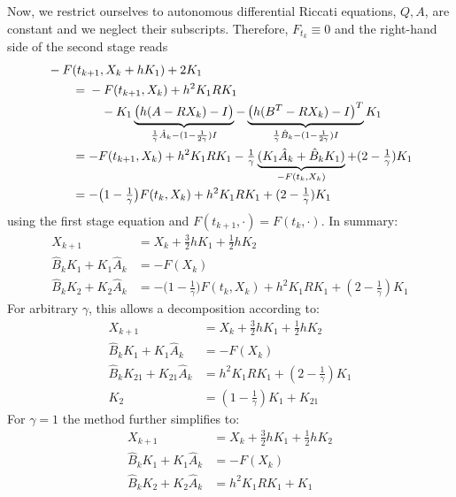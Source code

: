 Now, we restrict ourselves to autonomous differential Riccati equations,
\ie $Q, A$, \etc are constant and we neglect their subscripts.
Therefore, $F_{t_k}\equiv 0$ and the right-hand side of the second stage reads
\begin{subequations}\label{eq:mena:stage2:rhs:autonomous}
\begin{align}
  \MoveEqLeft
  -F(t_{k+1}, X_k + hK_1) + 2K_1
  \nonumber \\
  &= \begin{multlined}[t]
    -F(t_{k+1}, X_k) + h^2 K_1 R K_1 \\
    - K_1
    \underbrace{
      \big(h(A - R X_k) - I\big)
    }_{\frac{1}{\gamma} \hat{A}_k - (1-\frac{1}{2\gamma}) I}
    - \underbrace{
      \big(h(B^T - R X_k) - I\big)^T
    }_{\frac{1}{\gamma} \hat{B}_k - (1-\frac{1}{2\gamma}) I}
    K_1
  \end{multlined} \\
  &=
  -F(t_{k+1}, X_k) + h^2 K_1 R K_1
  -\tfrac{1}{\gamma}
  \underbrace{
    (K_1 \hat{A}_k + \hat{B}_k K_1)
  }_{-F(t_k,X_k)}
  + (2-\tfrac{1}{\gamma}) K_1 \\
  &= -\big(1-\tfrac{1}{\gamma}\big) F(t_k, X_k)
  + h^2 K_1 R K_1
  + (2-\tfrac{1}{\gamma}) K_1
\end{align}
\end{subequations}
using the first stage equation and $F(t_{k+1}, \cdot) = F(t_k,\cdot)$.
In summary:
\begin{subequations}
\begin{align}
  X_{k+1} &= X_k + \tfrac{3}{2} h K_1 + \tfrac{1}{2} h K_2 \\
  \hat{B}_k K_1 + K_1 \hat{A}_k &= -F(X_k) \\
  \hat{B}_k K_2 + K_2 \hat{A}_k &=
  -\big(1-\tfrac{1}{\gamma}\big) F(t_k, X_k)
  + h^2 K_1 R K_1
  + (2-\tfrac{1}{\gamma}) K_1
\end{align}
\end{subequations}
For arbitrary $\gamma$, this allows a decomposition according to:
\begin{subequations}\label{eq:mena:stages:autonomous}
\begin{align}
  X_{k+1} &= X_k + \tfrac{3}{2} h K_1 + \tfrac{1}{2} h K_2 \\
  \hat{B}_k K_1 + K_1 \hat{A}_k &= -F(X_k) \\
  \hat{B}_k K_{21} + K_{21} \hat{A}_k &= h^2 K_1RK_1 + (2-\tfrac{1}{\gamma}) K_1 \\
  K_2 &= (1-\tfrac{1}{\gamma}) K_1 + K_{21}
\end{align}
\end{subequations}
For $\gamma=1$ the method further simplifies to:
\begin{subequations}\label{eq:mena:stages:gamma=1}
\begin{align}
  X_{k+1} &= X_k + \tfrac{3}{2} h K_1 + \tfrac{1}{2} h K_2 \\
  \hat{B}_k K_1 + K_1 \hat{A}_k &= -F(X_k) \\
  \hat{B}_k K_2 + K_2 \hat{A}_k &= h^2 K_1RK_1 + K_1
  \label{eq:mena:err:linear}
\end{align}
\end{subequations}

